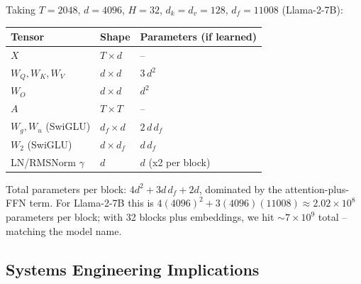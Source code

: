 Taking $T = 2048$, $d = 4096$, $H = 32$, $d_k = d_v = 128$,
$d_f = 11008$ (Llama-2-7B):
\begin{center}
\begin{tabular}{|l|l|l|}
\hline
Tensor & Shape & Parameters (if learned) \\
\hline
$X$                    & $T \times d$        & -- \\
$W_Q, W_K, W_V$        & $d \times d$        & $3\,d^2$ \\
$W_O$                  & $d \times d$        & $d^2$ \\
$A$                    & $T \times T$        & -- \\
$W_g, W_u$ (SwiGLU)    & $d_f \times d$      & $2\,d\,d_f$ \\
$W_2$ (SwiGLU)         & $d \times d_f$      & $d\,d_f$ \\
LN/RMSNorm $\gamma$    & $d$                 & $d$ (x2 per block) \\
\hline
\end{tabular}
\end{center}

Total parameters per block: $4d^2 + 3 d\, d_f + 2d$, dominated by the
attention-plus-FFN term. For Llama-2-7B this is
$4 (4096)^2 + 3 (4096)(11008) \approx 2.02 \times 10^{8}$ parameters
per block; with 32 blocks plus embeddings, we hit $\sim\!7\times 10^9$
total -- matching the model name.

\subsection{Systems Engineering Implications}

